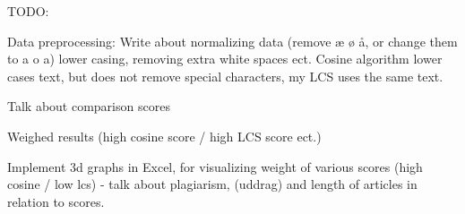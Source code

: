 TODO:

Data preprocessing:
Write about normalizing data (remove æ ø å, or change them to a o a) lower casing, removing extra white spaces ect.
Cosine algorithm lower cases text, but does not remove special characters, my LCS uses the same text.

Talk about comparison scores

Weighed results (high cosine score / high LCS score ect.)

Implement 3d graphs in Excel, for visualizing weight of various scores (high cosine / low lcs) - talk about plagiarism, (uddrag) and length of articles in relation to scores.